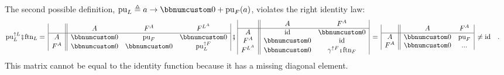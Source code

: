 The second possible definition, $\text{pu}_{L}\triangleq a\rightarrow\bbnum 0+\text{pu}_{F}(a)$,
violates the right identity law:
\begin{align*}
 & \text{pu}_{L}^{\uparrow L}\bef\text{ftn}_{L}=\,\begin{array}{|c||ccc|}
 & A & F^{A} & F^{L^{A}}\\
\hline A & \bbnum 0 & \text{pu}_{F} & \bbnum 0\\
F^{A} & \bbnum 0 & \bbnum 0 & \text{pu}_{L}^{\uparrow F}
\end{array}\,\bef\,\begin{array}{|c||cc|}
 & A & F^{A}\\
\hline A & \text{id} & \bbnum 0\\
F^{A} & \bbnum 0 & \text{id}\\
F^{L^{A}} & \bbnum 0 & \gamma^{\uparrow F}\bef\text{ftn}_{F}
\end{array}\,=\,\begin{array}{|c||cc|}
 & A & F^{A}\\
\hline A & \bbnum 0 & \text{pu}_{F}\\
F^{A} & \bbnum 0 & ...
\end{array}\,\neq\text{id}\quad.
\end{align*}
This matrix cannot be equal to the identity function because it has
a missing diagonal element.


